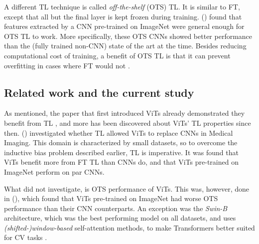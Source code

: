 
A different TL technique is called \textit{off-the-shelf} (OTS) TL. It is similar to FT, except that all but the final layer is kept frozen during training. \citeauthor{sharif2014cnn} (\citeyear{sharif2014cnn}) found that features extracted by a CNN pre-trained on ImageNet were general enough for OTS TL to work. More specifically, these OTS CNNs showed better performance than the (fully trained non-CNN) state of the art at the time. Besides reducing computational cost of training, a benefit of OTS TL is that it can prevent overfitting in cases where FT would not \citep{yosinski2014transferable}.


\subsection{Related work and the current study} \label{related_work}
As mentioned, the paper that first introduced ViTs already demonstrated they benefit from TL \citep{dosovitskiy2020image}, and more has been discovered about ViTs' TL properties since then. \citeauthor{matsoukas2021time} (\citeyear{matsoukas2021time}) investigated whether TL allowed ViTs to replace CNNs in Medical Imaging. This domain is characterized by small datasets, so to overcome the inductive bias problem described earlier, TL is imperative. It was found that ViTs benefit more from FT TL than CNNs do, and that ViTs pre-trained on ImageNet perform on par CNNs.

What \citeauthor{matsoukas2021time} did not investigate, is OTS performance of ViTs. This was, however, done in \citeauthor{zhou2021convnets} (\citeyear{zhou2021convnets}), which found that ViTs pre-trained on ImageNet had worse OTS performance than their CNN counterparts. An exception was the \textit{Swin-B} architecture, which was the best performing model on all datasets, and uses \textit{(shifted-)window-based} self-attention methods, to make Transformers better suited for CV tasks \citep{liu2021swin}.

